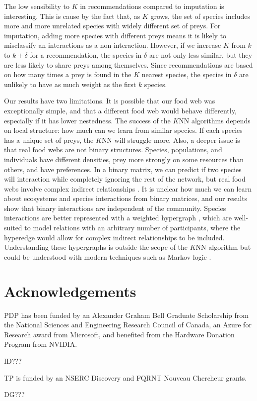\documentclass[letterpaper]{article}
\begin{document}
The low sensibility to $K$ in recommendations compared to imputation is
interesting. This is cause by the fact that, as $K$ grows, the set of species
includes more and more unrelated species with widely different set of preys.
For imputation, adding more species with different preys means it is likely to
misclassify an interactions as a non-interaction. However, if we increase $K$
from $k$ to $k + \delta$ for a recommendation, the species in $\delta$ are not
only less similar, but they are less likely to share preys among themselves.
Since recommendations are based on how many times a prey is found in the $K$
nearest species, the species in $\delta$ are unlikely to have as much weight as
the first $k$ species.

Our results have two limitations. It is possible that our food web was
exceptionally simple, and that a different food web would behave differently,
especially if it has lower nestedness. The success of the $K$NN algorithms
depends on local structure: how much can we learn from similar species. If each
species has a unique set of preys, the $K$NN will struggle more. Also, a deeper
issue is that real food webs are not binary structures. Species, populations,
and individuals have different densities, prey more strongly on some resources
than others, and have preferences. In a binary matrix, we can predict if two
species will interaction while completely ignoring the rest of the network, but
real food webs involve complex indirect relationships \cite{woo94}. It is
unclear how much we can learn about ecosystems and species interactions from
binary matrices, and our results show that binary interactions are independent
of the community. Species interactions are better represented with a weighted
hypergraph \cite{gao12}, which are well-suited to model relations with an
arbitrary number of participants, where the hyperedge would allow for complex
indirect relationships to be included. Understanding these hypergraphs is
outside the scope of the $K$NN algorithm but could be understood with modern
techniques such as Markov logic \cite{ric06}.


\section{Acknowledgements}

PDP has been funded by an Alexander Graham Bell Graduate Scholarship from the
National Sciences and Engineering Research Council of Canada, an Azure for
Research award from Microsoft, and benefited from the Hardware Donation Program
from NVIDIA.

ID???

TP is funded by an NSERC Discovery and FQRNT Nouveau Chercheur grants.

DG???



\end{document}
